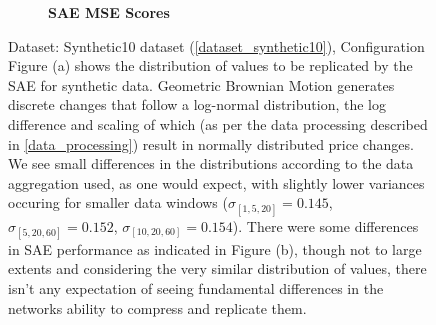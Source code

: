\documentclass[a4paper,11pt,oneside]{article}
\theoremstyle{plain}
\theoremstyle{definition}
\begin{document}
\begin{figure}[H]
\begin{subfigure}{.5\textwidth}
		\caption{\textbf{SAE MSE Scores} 
			\newline }
		\label{figure-test_aggregation_mse}
	\end{subfigure}
	\caption{Dataset: Synthetic10 dataset (\ref{dataset_synthetic10}), Configuration 
		\newline Figure (a) shows the distribution of values to be replicated by the SAE for synthetic data. Geometric Brownian Motion generates discrete changes that follow a log-normal distribution, the log difference and scaling of which (as per the data processing described in \ref{data_processing}) result in normally distributed price changes. We see small differences in the distributions according to the data aggregation used, as one would expect, with slightly lower variances occuring for smaller data windows ($\sigma_{[1,5,20]} = 0.145$, $\sigma_{[5,20,60]} = 0.152$, $\sigma_{[10,20,60]} = 0.154$). There were some differences in SAE performance as indicated in Figure (b), though not to large extents and considering the very similar distribution of values, there isn't any expectation of seeing fundamental differences in the networks ability to compress and replicate them. }
	\label{figure-data_sae_synthetic}
\end{figure}
\end{document}
